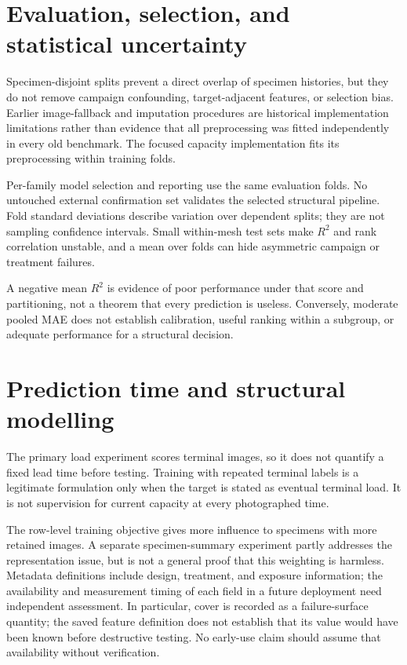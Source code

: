 \section{Evaluation, selection, and statistical uncertainty}
Specimen-disjoint splits prevent a direct overlap of specimen histories, but they do not remove campaign confounding, target-adjacent features, or selection bias. Earlier image-fallback and imputation procedures are historical implementation limitations rather than evidence that all preprocessing was fitted independently in every old benchmark. The focused capacity implementation fits its preprocessing within training folds.

Per-family model selection and reporting use the same evaluation folds. No untouched external confirmation set validates the selected structural pipeline. Fold standard deviations describe variation over dependent splits; they are not sampling confidence intervals. Small within-mesh test sets make $R^2$ and rank correlation unstable, and a mean over folds can hide asymmetric campaign or treatment failures.

A negative mean $R^2$ is evidence of poor performance under that score and partitioning, not a theorem that every prediction is useless. Conversely, moderate pooled MAE does not establish calibration, useful ranking within a subgroup, or adequate performance for a structural decision.

\section{Prediction time and structural modelling}
The primary load experiment scores terminal images, so it does not quantify a fixed lead time before testing. Training with repeated terminal labels is a legitimate formulation only when the target is stated as eventual terminal load. It is not supervision for current capacity at every photographed time.

The row-level training objective gives more influence to specimens with more retained images. A separate specimen-summary experiment partly addresses the representation issue, but is not a general proof that this weighting is harmless. Metadata definitions include design, treatment, and exposure information; the availability and measurement timing of each field in a future deployment need independent assessment. In particular, cover is recorded as a failure-surface quantity; the saved feature definition does not establish that its value would have been known before destructive testing. No early-use claim should assume that availability without verification.

